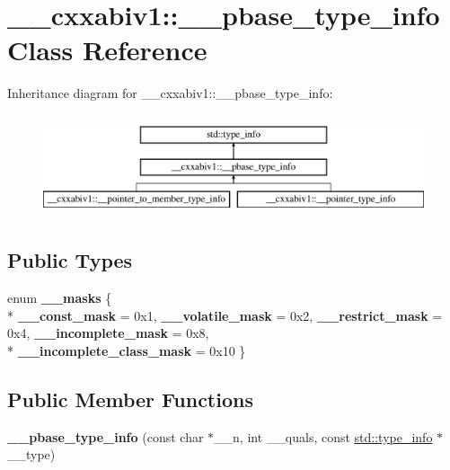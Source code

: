 \hypertarget{class____cxxabiv1_1_1____pbase__type__info}{\section{\+\_\+\+\_\+cxxabiv1\+:\+:\+\_\+\+\_\+pbase\+\_\+type\+\_\+info Class Reference}
\label{class____cxxabiv1_1_1____pbase__type__info}
}
Inheritance diagram for \+\_\+\+\_\+cxxabiv1\+:\+:\+\_\+\+\_\+pbase\+\_\+type\+\_\+info\+:\begin{figure}[H]
\begin{center}
\leavevmode
\includegraphics[height=3.000000cm]{class____cxxabiv1_1_1____pbase__type__info}
\end{center}
\end{figure}
\subsection*{Public Types}
\begin{DoxyCompactItemize}
\item 
\hypertarget{class____cxxabiv1_1_1____pbase__type__info_a6a775824a7f534a2dfea991b5e9bb417}{enum {\bfseries \+\_\+\+\_\+masks} \{ \\*
{\bfseries \+\_\+\+\_\+const\+\_\+mask} = 0x1, 
{\bfseries \+\_\+\+\_\+volatile\+\_\+mask} = 0x2, 
{\bfseries \+\_\+\+\_\+restrict\+\_\+mask} = 0x4, 
{\bfseries \+\_\+\+\_\+incomplete\+\_\+mask} = 0x8, 
\\*
{\bfseries \+\_\+\+\_\+incomplete\+\_\+class\+\_\+mask} = 0x10
 \}}\label{class____cxxabiv1_1_1____pbase__type__info_a6a775824a7f534a2dfea991b5e9bb417}

\end{DoxyCompactItemize}
\subsection*{Public Member Functions}
\begin{DoxyCompactItemize}
\item 
\hypertarget{class____cxxabiv1_1_1____pbase__type__info_a8bbe9a202f6eaac1a266a4740e779f63}{{\bfseries \+\_\+\+\_\+pbase\+\_\+type\+\_\+info} (const char $\ast$\+\_\+\+\_\+n, int \+\_\+\+\_\+quals, const \hyperlink{classstd_1_1type__info}{std\+::type\+\_\+info} $\ast$\+\_\+\+\_\+type)}\label{class____cxxabiv1_1_1____pbase__type__info_a8bbe9a202f6eaac1a266a4740e779f63}

\end{DoxyCompactItemize}
